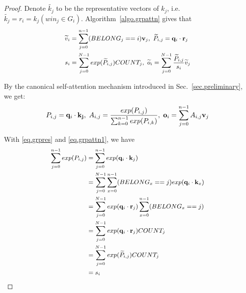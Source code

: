 \begin{sloppypar}
\begin{lemma}
\end{lemma}

\begin{proof}
Denote $\widetilde{k_j}$ to be the representative vectors of $k_j$, i.e. $\widetilde{k_j}=r_i=k_j (win_j \in G_i)$. Algorithm~\ref{algo.grpattn} gives that
\begin{equation}
\label{eq.grpres}
\small
\begin{aligned}
    \widetilde{v}_i&=\sum_{j=0}^{n-1}(BELONG_j==i)\mathbf{v}_j, \ \widetilde{P}_{i,j}=\mathbf{q}_i \cdot \mathbf{r}_j\\
    s_i&=\sum_{j=0}^{N-1}exp(\widetilde{P}_{i,j})COUNT_j, \ \widetilde{o}_i=\sum_{j=0}^{N-1}\frac{\widetilde{P}_{i,j}}{s_i}\widetilde{v}_j
\end{aligned}
\end{equation}

By the canonical self-attention mechanism introduced in Sec.~\ref{sec.preliminary}, we get:
\begin{equation}
\small
\label{eq.grpattn1}
P_{i,j}=\mathbf{q}_i \cdot \mathbf{k_j},\ A_{i,j}=\frac{exp(P_{i,j})}{\sum_{k=0}^{n-1}exp(P_{i,k})}, \ \mathbf{o}_i=\sum_{j=0}^{n-1}A_{i,j}\mathbf{v}_j
\end{equation}



With \ref{eq.grpres} and \ref{eq.grpattn1}, we have
\begin{equation}
\label{eq.sumexpahat}
\small
\begin{aligned}
    \sum_{j=0}^{n-1}exp(P_{i,j})&=\sum_{j=0}^{n-1}exp(\mathbf{q}_i \cdot \mathbf{k}_j)\\
    &=\sum_{j=0}^{N-1} \sum_{x=0}^{n-1}(BELONG_x==j)exp(\mathbf{q}_i \cdot \mathbf{k}_x)\\
    &=\sum_{j=0}^{N-1} exp(\mathbf{q}_i \cdot \mathbf{r}_j) \sum_{x=0}^{n-1} (BELONG_x==j) \\
    &=\sum_{j=0}^{N-1} exp(\mathbf{q}_i \cdot \mathbf{r}_j) COUNT_j
    \\
    &=\sum_{j=0}^{N-1} exp(\widetilde{P}_{i,j}) COUNT_j\\
    &=s_i\\
\end{aligned}
\end{equation}



\end{proof}
\end{sloppypar}
